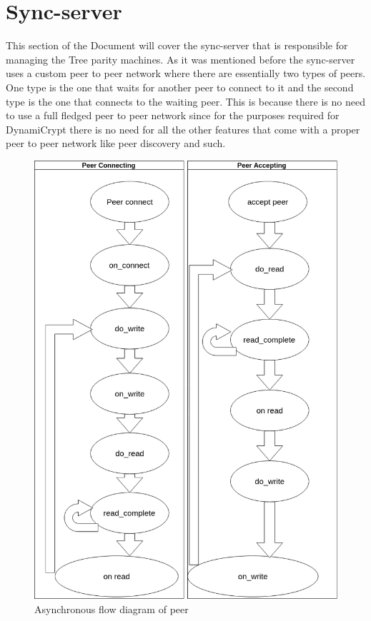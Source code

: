 \section{Sync-server}
This section of the Document will cover the sync-server that is responsible for managing the Tree parity machines. As it was mentioned before the sync-server uses a custom peer to peer network where there are essentially two types of peers. One type is the one that waits for another peer to connect to it and the second type is the one that connects to the waiting peer. This is because there is no need to use a full fledged peer to peer network since for the purposes required for DynamiCrypt there is no need for all the other features that come with a proper peer to peer network like peer discovery and such.

\begin{figure}[!h]
	\centering
	\includegraphics[width=1\textwidth]{Figures/sync_code_flow-modded.png}
	\caption[Asynchronous flow diagram of peer]{Asynchronous flow diagram of peer}
	\label{fig:s1}
\end{figure}
\FloatBarrier













 